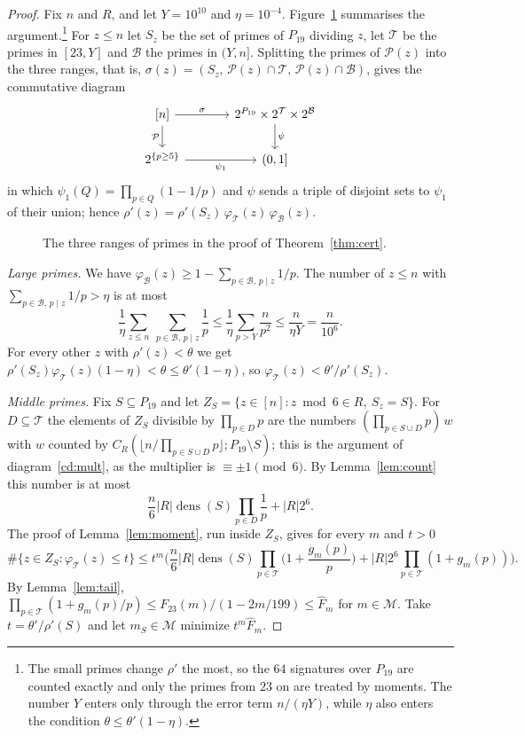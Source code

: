 \documentclass[11pt,a4paper]{article}
\theoremstyle{definition}
\theoremstyle{remark}
\begin{document}
\begin{proof}
Fix $n$ and $R$, and let $Y=10^{10}$ and $\eta=10^{-4}$. Figure~\ref{fig:ranges}
summarises the argument.\footnote{The small primes change $\rho'$ the most, so the $64$ signatures over $P_{19}$ are counted
exactly and only the primes from $23$ on are treated by moments. The number $Y$ enters only through
the error term $n/(\eta Y)$, while $\eta$ also enters the condition $\theta\le\theta'(1-\eta)$.} For $z\le n$ let $S_z$ be the set of primes
of $P_{19}$ dividing $z$, let $\mathcal{T}$ be the primes in $[23,Y]$ and $\mathcal{B}$ the primes in
$(Y,n]$. Splitting the primes of $\mathcal{P}(z)$ into the three ranges, that is,
$\sigma(z)=(S_z,\,\mathcal{P}(z)\cap\mathcal{T},\,\mathcal{P}(z)\cap\mathcal{B})$, gives the
commutative diagram
\begin{equation}\label{cd:split}
\begin{tikzcd}[column sep=large]
  {[n]} \arrow[r, "\sigma"] \arrow[d, "\mathcal{P}"'] &
  2^{P_{19}}\times2^{\mathcal{T}}\times2^{\mathcal{B}} \arrow[d, "\psi"] \\
  2^{\{p\ge5\}} \arrow[r, "\psi_1"'] & (0,1]
\end{tikzcd}
\end{equation}
in which $\psi_1(Q)=\prod_{p\in Q}(1-1/p)$ and $\psi$ sends a triple of disjoint sets to $\psi_1$ of
their union;
hence $\rho'(z)=\rho'(S_z)\,\varphi_\mathcal{T}(z)\,\varphi_\mathcal{B}(z)$.

\begin{figure}[t]
\centering

\caption{The three ranges of primes in the proof of Theorem~\ref{thm:cert}.}
\label{fig:ranges}
\end{figure}

\emph{Large primes.} We have $\varphi_\mathcal{B}(z)\ge1-\sum_{p\in\mathcal{B},\,p\mid z}1/p$. The
number of $z\le n$ with $\sum_{p\in\mathcal{B},\,p\mid z}1/p>\eta$ is at most
\[
  \frac1\eta\sum_{z\le n}\ \sum_{p\in\mathcal{B},\,p\mid z}\frac1p\le\frac1\eta\sum_{p>Y}\frac n{p^2}
  \le\frac n{\eta Y}=\frac n{10^6}.
\]
For every other $z$ with $\rho'(z)<\theta$ we get $\rho'(S_z)\varphi_\mathcal{T}(z)(1-\eta)<\theta\le
\theta'(1-\eta)$, so $\varphi_\mathcal{T}(z)<\theta'/\rho'(S_z)$.

\emph{Middle primes.} Fix $S\subseteq P_{19}$ and let $Z_S=\{z\in[n]:z\bmod6\in R,\ S_z=S\}$. For
$D\subseteq\mathcal{T}$ the elements of $Z_S$ divisible by $\prod_{p\in D}p$ are the numbers
$(\prod_{p\in S\cup D}p)\,w$ with $w$ counted by $C_R(\lfloor n/\prod_{p\in S\cup D}p\rfloor;
P_{19}\setminus S)$; this is the argument of diagram~\eqref{cd:mult}, as the multiplier is
$\equiv\pm1\pmod6$. By Lemma~\ref{lem:count} this number is at most
\[
  \frac n6|R|\operatorname{dens}(S)\prod_{p\in D}\frac1p+|R|2^{6}.
\]
The proof of Lemma~\ref{lem:moment}, run inside $Z_S$, gives for every $m$ and $t>0$
\[
  \#\{z\in Z_S:\varphi_\mathcal{T}(z)\le t\}\le t^m\Big(\frac n6|R|\operatorname{dens}(S)
  \prod_{p\in\mathcal{T}}\Big(1+\frac{g_m(p)}p\Big)+|R|2^6\prod_{p\in\mathcal{T}}(1+g_m(p))\Big).
\]
By Lemma~\ref{lem:tail}, $\prod_{p\in\mathcal{T}}(1+g_m(p)/p)\le F_{23}(m)/(1-2m/199)\le\hat F_m$
for $m\in\mathcal{M}$. Take $t=\theta'/\rho'(S)$ and let $m_S\in\mathcal{M}$ minimize
$t^m\hat F_m$.


\end{proof}
\end{document}
